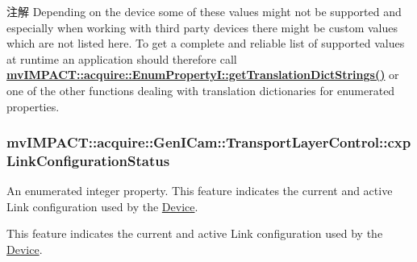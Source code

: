 \begin{DoxyNote}{注解}
Depending on the device some of these values might not be supported and especially when working with third party devices there might be custom values which are not listed here. To get a complete and reliable list of supported values at runtime an application should therefore call {\bfseries \hyperlink{classmv_i_m_p_a_c_t_1_1acquire_1_1_enum_property_i_a0ba6ccbf5ee69784d5d0b537924d26b6}{mv\+I\+M\+P\+A\+C\+T\+::acquire\+::\+Enum\+Property\+I\+::get\+Translation\+Dict\+Strings()}} or one of the other functions dealing with translation dictionaries for enumerated properties. 
\end{DoxyNote}
\hypertarget{classmv_i_m_p_a_c_t_1_1acquire_1_1_gen_i_cam_1_1_transport_layer_control_a1d31bd57c58be9b4d17d8a57b166199d}{
\subsubsection[{cxp\+Link\+Configuration\+Status}]{ mv\+I\+M\+P\+A\+C\+T\+::acquire\+::\+Gen\+I\+Cam\+::\+Transport\+Layer\+Control\+::cxp\+Link\+Configuration\+Status}}\label{classmv_i_m_p_a_c_t_1_1acquire_1_1_gen_i_cam_1_1_transport_layer_control_a1d31bd57c58be9b4d17d8a57b166199d}


An enumerated integer property. This feature indicates the current and active Link configuration used by the \hyperlink{classmv_i_m_p_a_c_t_1_1acquire_1_1_device}{Device}. 

This feature indicates the current and active Link configuration used by the \hyperlink{classmv_i_m_p_a_c_t_1_1acquire_1_1_device}{Device}.

